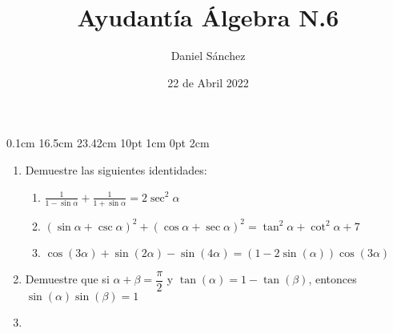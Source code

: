 \documentclass[12pt]{article}
\newcommand{\D}{\displaystyle}
\begin{document}
\setmargins{2.5cm}
{0.1cm}
{16.5cm}
{23.42cm}
{10pt}
{1cm}
{0pt}
{2cm}

\title{Ayudant\'ia \'Algebra N.6}
\date{22 de Abril 2022}
\author{Daniel S\'anchez}
\maketitle

\begin{enumerate}
      \item Demuestre las siguientes identidades:
            \begin{enumerate}
                  \item $\D \frac{1}{1-\sin \alpha} + \frac{1}{1+\sin \alpha} = 2\sec ^2 \alpha$
                  \item $(\sin \alpha + \csc \alpha)^2 + (\cos \alpha + \sec \alpha)^2 = \tan ^2 \alpha + \cot ^2 \alpha + 7$
                  \item $\cos (3\alpha) + \sin (2\alpha) - \sin (4\alpha) = (1-2\sin(\alpha))\cos(3\alpha)$
            \end{enumerate}
      \item Demuestre que si $\alpha + \beta = \dfrac{\pi}{2}$ y $\tan (\alpha) = 1-\tan (\beta)$, entonces $\sin(\alpha)\sin(\beta)=1$
      \item 
\end{enumerate}
\end{document}
